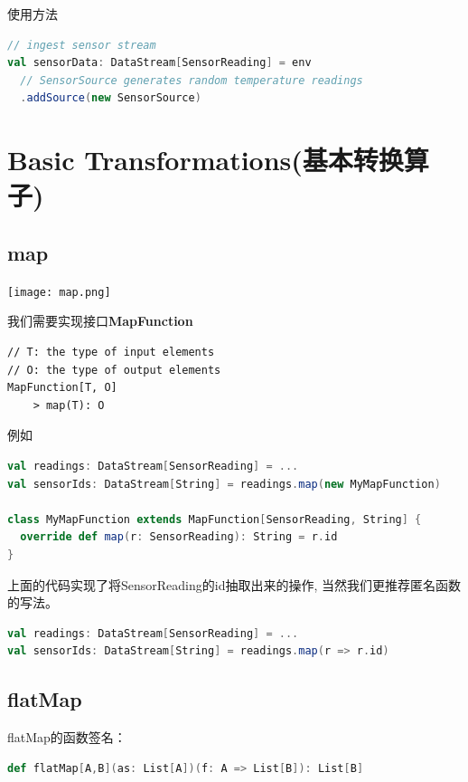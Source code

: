 \documentclass[oneside]{ctexbook}
\begin{document}
使用方法

\begin{lstlisting}[language=scala, breaklines]
// ingest sensor stream
val sensorData: DataStream[SensorReading] = env
  // SensorSource generates random temperature readings
  .addSource(new SensorSource)
\end{lstlisting}

\section{Basic Transformations(基本转换算子)}

\subsection{map}

\noindent \texttt{[image: map.png]}

我们需要实现接口\textbf{MapFunction}

\begin{lstlisting}
// T: the type of input elements
// O: the type of output elements
MapFunction[T, O]
    > map(T): O
\end{lstlisting}

例如

\begin{lstlisting}[language=scala, breaklines]
val readings: DataStream[SensorReading] = ...
val sensorIds: DataStream[String] = readings.map(new MyMapFunction)

class MyMapFunction extends MapFunction[SensorReading, String] {
  override def map(r: SensorReading): String = r.id
}
\end{lstlisting}

上面的代码实现了将SensorReading的id抽取出来的操作, 当然我们更推荐匿名函数的写法。

\begin{lstlisting}[language=scala, breaklines]
val readings: DataStream[SensorReading] = ...
val sensorIds: DataStream[String] = readings.map(r => r.id)
\end{lstlisting}

\subsection{flatMap}

flatMap的函数签名：

\begin{lstlisting}[language=scala, breaklines]
def flatMap[A,B](as: List[A])(f: A => List[B]): List[B]
\end{lstlisting}
\end{document}

